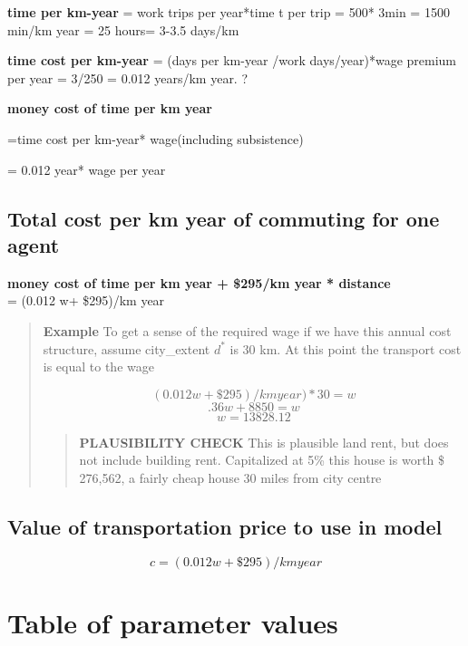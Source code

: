 \textbf{time  per km-year} = work trips per year*time t per trip = 500* 3min  = 1500 min/km year = 25 hours= 3-3.5 days/km
 
\textbf{time cost per km-year} =  (days per km-year /work days/year)*wage premium per year  = 3/250 = 0.012 years/km year. ?

\textbf{money cost of time per km year} 

=time cost per km-year* wage(including subsistence) 

= 0.012 year* wage per year

\subsection{Total cost per km year of commuting for one agent}
\textbf{money cost of time per km year + \$295/km year * distance} \\
= (0.012 w+ \$295)/km year 
    \begin{quotation}
    \textbf{Example}
    To get a sense of the required wage if we have this annual cost structure, assume city\_extent $d^*$ is 30 km. At this point the transport cost is equal to the wage

\[(0.012 w+ \$295)/km year)*30 =  w\] 
\[.36w+ 8850=w\]
\[w=13828.12\]
        \begin{quotation}
        \textbf{PLAUSIBILITY CHECK}
This is plausible land rent, but does not include building rent. 
Capitalized at 5\% this house is worth \$ 276,562, a fairly cheap house 30 miles from city centre
        \end{quotation}
    \end{quotation}



\subsection{Value of transportation price to use in model}
\[ {c}=(0.012 w+ \$295)/km year \]



\section{Table of parameter values}

